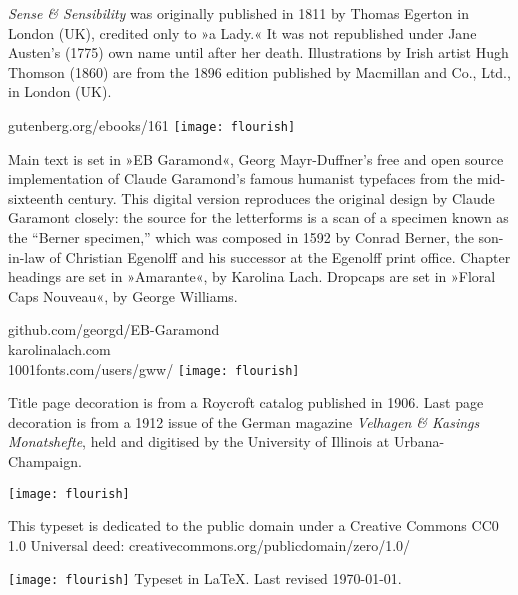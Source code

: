 \documentclass[
a5paper,
]{scrbook}
\begin{document}
\centering
\vfill
\begin{minipage}{\textwidth}
\textit{Sense \& Sensibility} was originally published in 1811 by Thomas Egerton in London (UK), credited only to »a Lady.« It was not republished under Jane Austen's (1775) own name until after her death. Illustrations by Irish artist Hugh Thomson (1860) are from the 1896 edition published by Macmillan and Co., Ltd., in London (UK).
\end{minipage}
\vfill
gutenberg.org/ebooks/161
\vfill
\texttt{[image: flourish]}
\vfill
\begin{minipage}{\textwidth}
Main text is set in »EB Garamond«, Georg Mayr-Duffner's free and open source implementation of Claude Garamond’s famous humanist typefaces from the mid-sixteenth century. This digital version reproduces the original design by Claude Garamont closely: the source for the letterforms is a scan of a specimen known as the \enquote{Berner specimen,} which was composed in 1592 by Conrad Berner, the son-in-law of Christian Egenolff and his successor at the Egenolff print office. Chapter headings are set in »Amarante«, by Karolina Lach. Dropcaps are set in »Floral Caps Nouveau«, by George Williams. 
\end{minipage} 
\vfill
github.com/georgd/EB-Garamond\\
karolinalach.com\\
1001fonts.com/users/gww/
\vfill
\texttt{[image: flourish]}
\vfill
\begin{minipage}{\textwidth}
Title page decoration is from a Roycroft catalog published in 1906. Last page decoration is from a 1912 issue of the German magazine \textit{Velhagen \& Kasings Monatshefte}, held and digitised by the University of Illinois at Urbana-Champaign.
\end{minipage}
\vfill
\texttt{[image: flourish]}
\vfill
\begin{minipage}{\textwidth}
This typeset is dedicated to the public domain under a Creative Commons CC0 1.0 Universal deed: creativecommons.org/publicdomain/zero/1.0/
\end{minipage}
\vfill
\texttt{[image: flourish]}
\vfill
Typeset in \LaTeX{}. Last revised \today.
\thispagestyle{empty}
\end{document}
